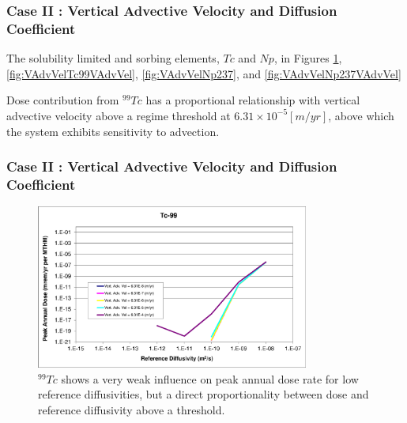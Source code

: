 \begin{frame}[c]
  \frametitle{Case II : Vertical Advective Velocity and Diffusion Coefficient}
The solubility limited and sorbing elements, $Tc$ and $Np$, in Figures 
\ref{fig:VAdvVelTc99}, \ref{fig:VAdvVelTc99VAdvVel}, \ref{fig:VAdvVelNp237}, and 
\ref{fig:VAdvVelNp237VAdvVel}

Dose contribution from $^{99}Tc$ has a proportional 
relationship with vertical advective velocity above a regime threshold at 
$6.31\times10^{-5}[m/yr]$, above which the system exhibits sensitivity to 
advection. 

\end{frame}

\begin{frame}[c]
  \frametitle{Case II : Vertical Advective Velocity and Diffusion Coefficient}
\begin{figure}[htp!]
\centering
\includegraphics[width=0.8\textwidth]{AdvVelAndDiffCoeffEBSFail/Tc-99.eps}
\caption{$^{99}Tc$ 
shows a very weak influence on peak annual dose 
rate for low reference diffusivities, but a direct proportionality between 
dose and reference diffusivity above a threshold.}
\label{fig:VAdvVelTc99}
\end{figure}
\end{frame}

